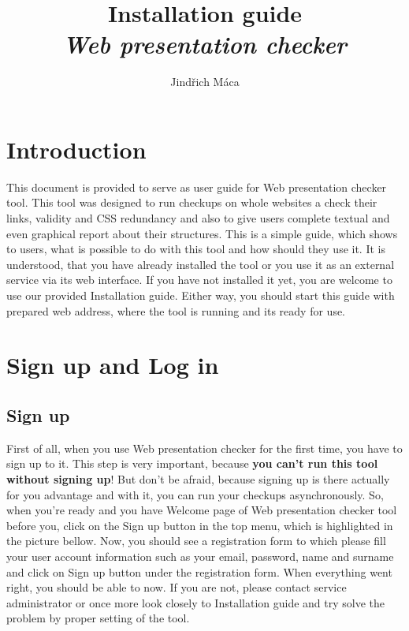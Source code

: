 \documentclass[12pt,a4paper]{article}
\author{Jindřich Máca}
\title{Installation guide\\\textit{Web presentation checker}}
\begin{document}
\maketitle
\tableofcontents
\newpage

\section{Introduction}
This document is provided to serve as user guide for Web presentation checker tool. This tool was designed to run checkups on whole websites a check their links, validity and CSS redundancy and also to give users complete textual and even graphical report about their structures. This is a simple guide, which shows to users, what is possible to do with this tool and how should they use it. It is understood, that you have already installed the tool or you use it as an external service via its web interface. If you have not installed it yet, you are welcome to use our provided Installation guide. Either way, you should start this guide with prepared web address, where the tool is running and its ready for use.

\section{Sign up and Log in}
\subsection{Sign up} \label{signup}
First of all, when you use Web presentation checker for the first time, you have to sign up to it. This step is very important, because \textbf{you can't run this tool without signing up}! But don't be afraid, because signing up is there actually for you advantage and with it, you can run your checkups asynchronously. So, when you're ready and you have Welcome page of Web presentation checker tool before you, click on the Sign up button in the top menu, which is highlighted in the picture bellow. Now, you should see a registration form to which please fill your user account information such as your email, password, name and surname and click on Sign up button under the registration form. When everything went right, you should be able to  now. If you are not, please contact service administrator or once more look closely to Installation guide and try solve the problem by proper setting of the tool.
\end{document}
